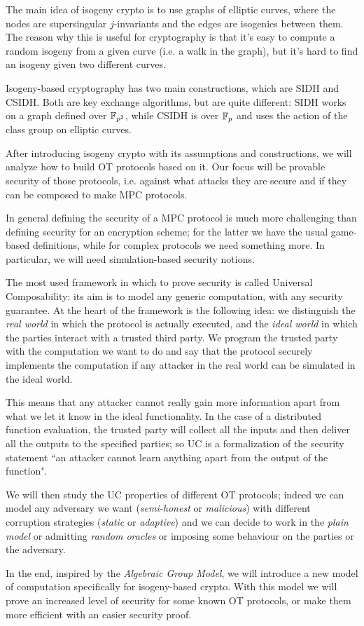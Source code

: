 The main idea of isogeny crypto is to use graphs of elliptic curves, where the nodes are supersingular $j$-invariants and the edges are isogenies between them. The reason why this is useful for cryptography is that it's easy to compute a random isogeny from a given curve (i.e. a walk in the graph), but it's hard to find an isogeny given two different curves.

Isogeny-based cryptography has two main constructions, which are SIDH and CSIDH. Both are key exchange algorithms, but are quite different: SIDH works on a graph defined over $\mathbb{F}_{p^2}$, while CSIDH is over $\mathbb{F}_p$ and uses the action of the class group on elliptic curves.

After introducing isogeny crypto with its assumptions and constructions, we will analyze how to build OT protocols based on it. Our focus will be provable security of those protocols, i.e. against what attacks they are secure and if they can be composed to make MPC protocols.

In general defining the security of a MPC protocol is much more challenging than defining security for an encryption scheme; for the latter we have the usual game-based definitions, while for complex protocols we need something more. In particular, we will need simulation-based security notions.

The most used framework in which to prove security is called Universal Composability: its aim is to model any generic computation, with any security guarantee. At the heart of the framework is the following idea: we distinguish the \emph{real world} in which the protocol is actually executed, and the \emph{ideal world} in which the parties interact with a trusted third party. We program the trusted party with the computation we want to do and say that the protocol securely implements the computation if any attacker in the real world can be simulated in the ideal world.

This means that any attacker cannot really gain more information apart from what we let it know in the ideal functionality. In the case of a distributed function evaluation, the trusted party will collect all the inputs and then deliver all the outputs to the specified parties; so UC is a formalization of the security statement ``an attacker cannot learn anything apart from the output of the function".

We will then study the UC properties of different OT protocols; indeed we can model any adversary we want (\emph{semi-honest} or \emph{malicious}) with different corruption strategies (\emph{static} or \emph{adaptive}) and we can decide to work in the \emph{plain model} or admitting \emph{random oracles} or imposing some behaviour on the parties or the adversary.

In the end, inspired by the \emph{Algebraic Group Model}, we will introduce a new model of computation specifically for isogeny-based crypto. With this model we will prove an increased level of security for some known OT protocols, or make them more efficient with an easier security proof.

